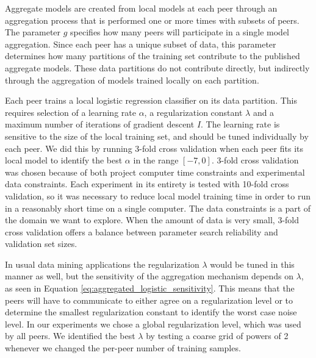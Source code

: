 Aggregate models are created from local models at each peer through an aggregation process that is performed one or more times with subsets of peers. The parameter $g$ specifies how many peers will participate in a single model aggregation. Since each peer has a unique subset of data, this parameter determines how many partitions of the training set contribute to the published aggregate models. These data partitions do not contribute directly, but indirectly through the aggregation of models trained locally on each partition.

Each peer trains a local logistic regression classifier on its data partition. This requires selection of a learning rate $\alpha$, a regularization constant $\lambda$ and a maximum number of iterations of gradient descent $I$. The learning rate is sensitive to the size of the local training set\cite{wilson20013learningrate}, and should be tuned individually by each peer. We did this by running 3-fold cross validation when each peer fits its local model to identify the best $\alpha$ in the range $[-7, 0]$. 3-fold cross validation was chosen because of both project computer time constraints and experimental data constraints. Each experiment in its entirety is tested with 10-fold cross validation, so it was necessary to reduce local model training time in order to run in a reasonably short time on a single computer. The data constraints is a part of the domain we want to explore. When the amount of data is very small, 3-fold cross validation offers a balance between parameter search reliability and validation set sizes.

In usual data mining applications the regularization $\lambda$ would be tuned in this manner as well, but the sensitivity of the aggregation mechanism depends on $\lambda$, as seen in Equation \ref{eq:aggregated_logistic_sensitivity}. This means that the peers will have to communicate to either agree on a regularization level or to determine the smallest regularization constant to identify the worst case noise level. In our experiments we chose a global regularization level, which was used by all peers. We identified the best $\lambda$ by testing a coarse grid of powers of 2 whenever we changed the per-peer number of training samples. 

